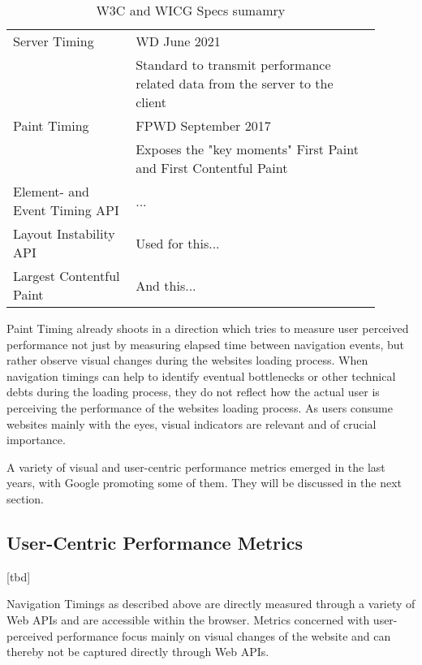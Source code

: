 \begin{table}[h]
\begin{tabular}{ | p{0.3\linewidth} | p{0.6\linewidth} | }
	\hline
	Server Timing
	& WD June 2021 \\
	& Standard to transmit performance related data from the server to the client \\
	\hline
	Paint Timing
	& FPWD September 2017 \\
	& Exposes the "key moments" First Paint and First Contentful Paint \\
	\hline
	Element- and Event Timing API & ...  \\
	Layout Instability API & Used for this... \\
	Largest Contentful Paint & And this... \\
	\hline
	\end{tabular}
	\medskip
	\caption{W3C and WICG Specs sumamry}
	\label{table:apis_summary} %
\end{table}



Paint Timing already shoots in a direction which tries to measure user perceived performance not just by measuring elapsed time between navigation events, but rather observe visual changes during the websites loading process.
When navigation timings can help to identify eventual bottlenecks or other technical debts during the loading process, they do not reflect how the actual user is perceiving the performance of the websites loading process.
As users consume websites mainly with the eyes, visual indicators are relevant and of crucial importance.

A variety of visual and user-centric performance metrics emerged in the last years, with Google promoting some of them.
They will be discussed in the next section.






\subsection{User-Centric Performance Metrics}


[tbd]



Navigation Timings as described above are directly measured through a variety of Web APIs and are accessible within the browser.
Metrics concerned with user-perceived performance focus mainly on visual changes of the website and can thereby not be captured directly through Web APIs.


